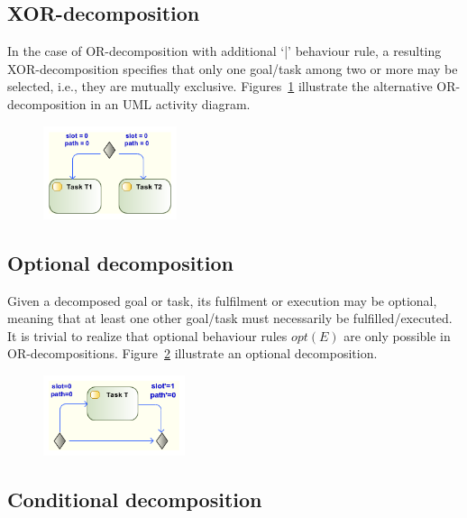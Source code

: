 \subsection{XOR-decomposition}

In the case of OR-decomposition with additional `|' behaviour rule, a resulting XOR-decomposition specifies that only one goal/task among two or more may be selected, i.e., they are mutually exclusive. Figures~\ref{fig:UML_ALT_TSKS} illustrate the alternative OR-decomposition in an UML activity diagram.

\begin{figure}[ht!]
\centering
\includegraphics[width=0.35\textwidth]{imgs/UML_ALT_TSKS.png}
\caption{}
\label{fig:UML_ALT_TSKS}
\end{figure}

\subsection{Optional decomposition}

Given a decomposed goal or task, its fulfilment or execution may be optional, meaning that at least one other goal/task must necessarily be fulfilled/executed. It is trivial to realize that optional behaviour rules $opt(E)$ are only possible in OR-decompositions. Figure~\ref{fig:UML_OPT_TSK} illustrate an optional decomposition.

\begin{figure}[ht!]
\centering
\includegraphics[width=0.37\textwidth]{imgs/UML_OPT_TSK.png}
\caption{}
\label{fig:UML_OPT_TSK}
\end{figure}

\subsection{Conditional decomposition}

